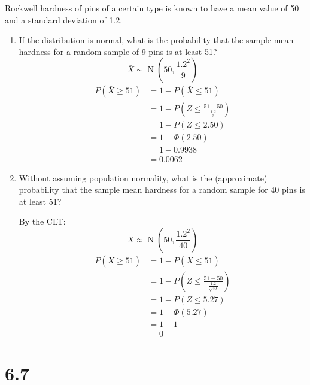 \documentclass[letterpaper,12pt,fleqn]{article}
\newcommand{\xb}{\bar{X}}
\renewcommand{\P}{\Phi}
\DeclareMathOperator{\nd}{N}
\begin{document}
Rockwell hardness of pins of a certain type is known to have a mean value of 50 and a standard deviation of 1.2.
\begin{enumerate}[label={\alph*)}]
\item If the distribution is normal, what is the probability that the sample mean hardness for a random sample of 9 pins is
  at least 51?
  \[\xb\sim\nd(50,\frac{1.2^2}{9})\]
  \begin{align*}
    P(\xb\ge51) &= 1-P(\xb\le51) \\
    &= 1-P\left(Z\le\frac{51-50}{\frac{1.2}{3}}\right) \\
    &= 1-P(Z\le2.50) \\
    &= 1-\P(2.50) \\
    &= 1-0.9938 \\
    &= 0.0062
  \end{align*}
\item Without assuming population normality, what is the (approximate) probability that the sample mean hardness for a
  random sample for 40 pins is at least 51?

  By the CLT:
  \[\xb\approx\nd\left(50,\frac{1.2^2}{40}\right)\]
  \begin{align*}
    P(\xb\ge51) &= 1-P(\xb\le51) \\
    &= 1-P\left(Z\le\frac{51-50}{\frac{1.2}{\sqrt{40}}}\right) \\
    &= 1-P(Z\le5.27) \\
    &= 1-\P(5.27) \\
    &= 1-1 \\
    &= 0
  \end{align*}
\end{enumerate}

\section*{6.7}
\end{document}
